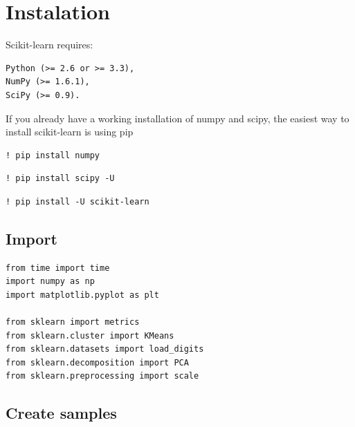\section{Instalation}\label{instalation}

Scikit-learn requires:

\begin{verbatim}
Python (>= 2.6 or >= 3.3),
NumPy (>= 1.6.1),
SciPy (>= 0.9).
\end{verbatim}

If you already have a working installation of numpy and scipy, the
easiest way to install scikit-learn is using pip

\begin{verbatim}
! pip install numpy
\end{verbatim}

\begin{verbatim}
! pip install scipy -U
\end{verbatim}

\begin{verbatim}
! pip install -U scikit-learn
\end{verbatim}

\subsection{Import}\label{import}

\begin{verbatim}
from time import time
import numpy as np
import matplotlib.pyplot as plt

from sklearn import metrics
from sklearn.cluster import KMeans
from sklearn.datasets import load_digits
from sklearn.decomposition import PCA
from sklearn.preprocessing import scale
\end{verbatim}

\subsection{Create samples}\label{create-samples}

